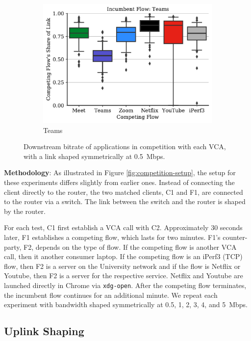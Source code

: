 \begin{figure}[t!]
\begin{subfigure}[t]{.33\textwidth}
    \includegraphics[width=1\textwidth]{figures/comp/box_plot_teams_dl_0.5.pdf}
    \caption{Teams}
    \label{fig:zoom_box_1}
\end{subfigure}
\caption{Downstream bitrate of applications in competition with each VCA, with a link shaped symmetrically at 0.5~Mbps.}
\label{fig:interrupt-upld}
\end{figure}


\noindent \textbf{Methodology}: As illustrated in Figure \ref{fig:competition-setup}, the setup for these experiments differs slightly from earlier ones. 
Instead of connecting the client directly to the router, the two matched clients, C1 and F1, are connected to the router via a switch. 
The link between the switch and the router is shaped by the router.

For each test, C1 first establish a VCA call with C2.
Approximately 30 seconds later, F1 establishes a competing flow, which lasts for two minutes.
F1's counter-party, F2, depends on the type of flow.
If the competing flow is another VCA call, then it another consumer laptop.
If the competing flow is an iPerf3 (TCP) flow, then F2 is a server on the University network
  and if the flow is Netflix or Youtube, then F2 is a server for the respective service.
Netflix and Youtube are launched directly in Chrome via \texttt{xdg-open}.
After the competing flow terminates, the incumbent flow continues for an additional minute.
We repeat each experiment with bandwidth shaped symmetrically at 0.5, 1, 2, 3, 4, and 5~Mbps.

\subsection{Uplink Shaping}

